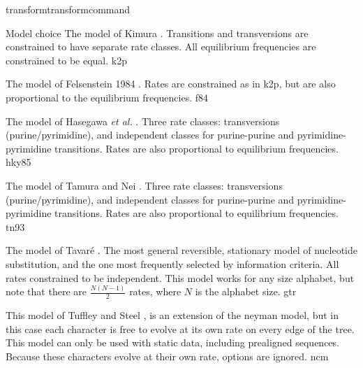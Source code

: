 \begin{command}{transform}{transformcommand}
\begin{arguments}
\begin {argumentgroup} {Model choice}
                        {The model of Kimura \cite{kimura1980}. Transitions and
                        transversions are constrained to have separate rate
                        classes. All equilibrium frequencies are constrained to be
                        equal.}
                        {k2p}

                        {The model of Felsenstein 1984 \cite{felsenstein1980}. Rates
                        are constrained as in k2p, but are also proportional to
                        the equilibrium frequencies.}
                        {f84}

                        {The model of Hasegawa \emph{et al.} \cite{hasegawa1984}. 
                        Three rate classes:
                        transversions (purine/pyrimidine), and independent
                        classes for purine-purine and pyrimidine-pyrimidine
                        transitions. Rates are also proportional to equilibrium
                        frequencies.}
                        {hky85}

                        {The model of Tamura and Nei \cite{tamura1993}. Three
                        rate classes: transversions (purine/pyrimidine), and
                        independent classes for purine-purine and
                        pyrimidine-pyrimidine transitions. Rates are also
                        proportional to equilibrium frequencies.}
                        {tn93}

                        {The model of Tavar\'{e} \cite{tavare1986}. The most general
                        reversible, stationary model of nucleotide substitution,
                        and the one most frequently selected by information
                        criteria. All rates constrained to be independent. This
                        model works for any size alphabet, but note that there
                        are $\frac{N (N-1)}{2}$ rates, where $N$ is the alphabet
                        size.}
                        {gtr}
        
                        {This model of Tuffley and Steel \cite{tuffleyandsteel1998}, is an 
                        extension of the neyman model, but in this case each character is 
                        free to evolve at its own rate on every edge of the tree. This 
                        model can only be used with static data, including prealigned sequences.  
                        Because these characters evolve at their own rate,  
                        options are ignored.}
                        {ncm}
                        

\end{argumentgroup}
\end{arguments}
\end{command}
